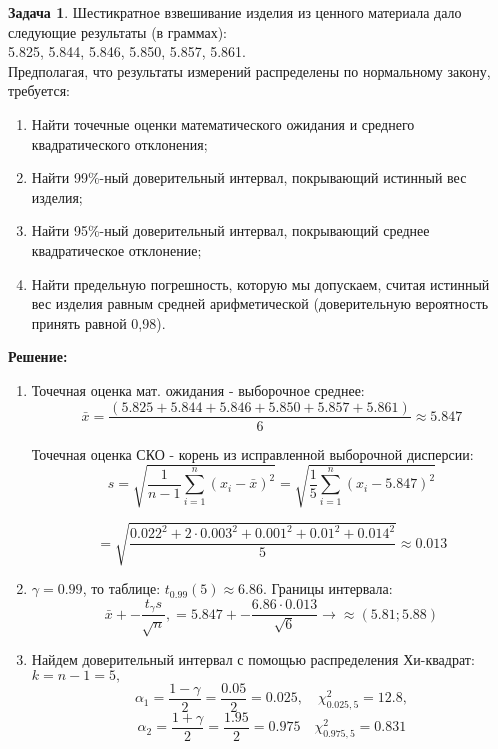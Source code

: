 \documentclass[a4paper,11pt]{article}
\newenvironment{shdd}{\begin{mdframed}[backgroundcolor=shadecolor]}{\end{mdframed}}
\theoremstyle{definition}
\newtheorem{problem}{Задача}\setlength{\parindent}{0pt}
\newenvironment{solution}
{\begin{shdd}\textbf{Решение:}\par\setlength{\parindent}{0pt}}
{\end{shdd}}
\begin{document}
\vspace{10pt}
\begin{problem}
    Шестикратное взвешивание изделия из ценного материала дало следующие результаты
    (в граммах): 
    \\ 5.825, 5.844, 5.846, 5.850, 5.857, 5.861. 
    \\ Предполагая, что результаты измерений распределены по нормальному закону, требуется:
    \begin{enumerate}
        \item Найти точечные оценки математического ожидания и среднего квадратического отклонения;
        \item Найти 99\%-ный доверительный интервал, покрывающий истинный вес изделия; 
        \item Найти 95\%-ный доверительный интервал, покрывающий среднее квадратическое отклонение; 
        \item Найти предельную погрешность, которую мы допускаем, считая истинный вес изделия равным
        средней арифметической (доверительную вероятность принять равной 0,98).
    \end{enumerate} 
    \begin{solution}
        \begin{enumerate}
            \item Точечная оценка мат. ожидания - выборочное среднее: 
                \[
                \bar{x} = \frac{(5.825+5.844+5.846+5.850+5.857+5.861)}{6}\approx5.847
                \]
                
                Точечная оценка СКО - корень из исправленной выборочной дисперсии:
                \[
                s = \sqrt{\frac{1}{n-1}\sum^n_{i=1}(x_i - \bar{x})^2} 
                = \sqrt{\frac{1}{5}\sum^n_{i=1}(x_i - 5.847)^2}
                \]
                
                \[
                = \sqrt{\frac{0.022^2+2\cdot0.003^2+0.001^2+0.01^2+0.014^2}{5}} \approx 0.013
                \]

            \item 
                \(\gamma = 0.99\), то таблице: \(t_{0.99}(5) \approx 6.86\).
                \newline Границы интервала: 
                    \[ \bar{x} +- \frac{t_{\gamma}s}{\sqrt{n}}, = 5.847 +- \frac{6.86\cdot0.013}{\sqrt{6}} \rightarrow \approx (5.81; 5.88)\]
            \item Найдем доверительный интервал с помощью распределения Хи-квадрат:
                \newline \(k=n-1=5,\)
                \newline \[\alpha_1 = \frac{1-\gamma}{2} = \frac{0.05}{2} = 0.025, \quad \chi^2_{0.025, 5} = 12.8,\]
                \newline \[
                         \alpha_2 = \frac{1+\gamma}{2} = \frac{1.95}{2} = 0.975 \quad \chi^2_{0.975, 5} = 0.831
                         \]


\end{enumerate}
\end{solution}
\end{problem}
\end{document}
